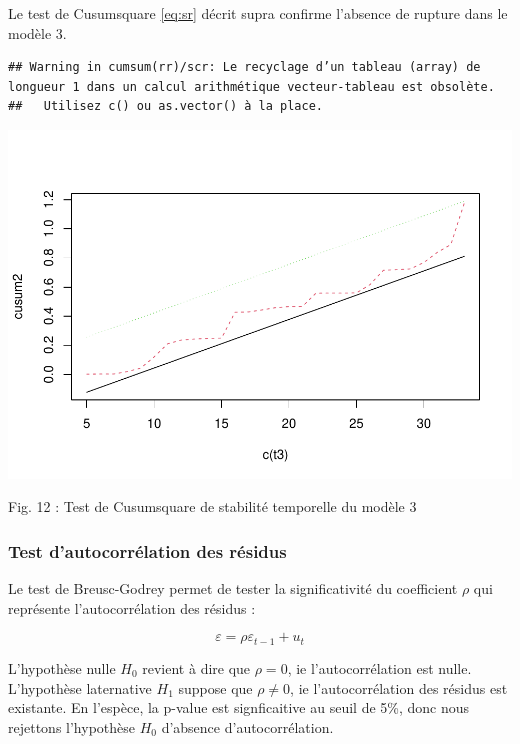 \documentclass[
]{article}
\begin{document}
{{Le test de Cusumsquare \ref{eq:sr} décrit supra confirme l'absence de
rupture dans le modèle 3.

\begin{verbatim}
## Warning in cumsum(rr)/scr: Le recyclage d’un tableau (array) de longueur 1 dans un calcul arithmétique vecteur-tableau est obsolète.
##   Utilisez c() ou as.vector() à la place.
\end{verbatim}

\includegraphics{Projet_econometrie_II_files/figure-latex/unnamed-chunk-14-1.pdf}

Fig. 12 : Test de Cusumsquare de stabilité temporelle du modèle 3

\hypertarget{test-dautocorruxe9lation-des-ruxe9sidus}{%
\subsubsection{Test d'autocorrélation des
résidus}\label{test-dautocorruxe9lation-des-ruxe9sidus}}

Le test de Breusc-Godrey permet de tester la significativité du
coefficient \(\rho\) qui représente l'autocorrélation des résidus :

\begin{equation}
    \label{eq:BG}
\varepsilon = \rho \varepsilon_{t-1} + u_t
\end{equation}

L'hypothèse nulle \(H_0\) revient à dire que \(\rho=0\), ie
l'autocorrélation est nulle. L'hypothèse laternative \(H_1\) suppose que
\(\rho \ne 0\), ie l'autocorrélation des résidus est existante. En
l'espèce, la p-value est signficaitive au seuil de 5\%, donc nous
rejettons l'hypothèse \(H_0\) d'absence d'autocorrélation.

}}
\end{document}
